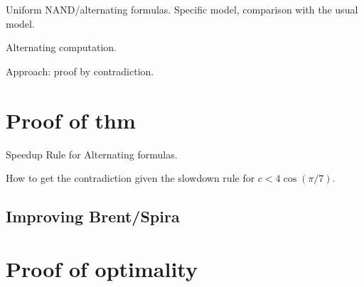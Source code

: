 \documentclass[a4paper, 12pt]{article}
\theoremstyle{plain}
\theoremstyle{definition}
\theoremstyle{remark}
\newcommand{\NAND}{\textsf{NAND}}%
\begin{document}
Uniform \NAND/alternating formulas. Specific model, comparison with the usual model.

Alternating computation.

Approach: proof by contradiction.

\section{Proof of thm}
Speedup Rule for Alternating formulas.

How to get the contradiction given the slowdown rule for $c < 4\cos(\pi /7)$.

\subsection{Improving Brent/Spira}

\section{Proof of optimality}




\end{document}
